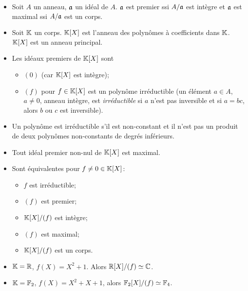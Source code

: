 \begin{itemize}
\item Soit $A$ un anneau, $\mathfrak{a}$ un idéal de $A$. $\mathfrak{a}$ est premier ssi $A/\mathfrak{a}$ est intègre et $\mathfrak{a}$ est maximal ssi
  $A/\mathfrak{a}$ est un corps.

\item Soit $\mathbb{K}$ un corps. $\mathbb{K}[X]$ est l'anneau des polynômes à coefficients dans $\mathbb{K}$. $\mathbb{K}[X]$ est un anneau
  principal. 

\item Les idéaux premiers de $\mathbb{K}[X]$ sont
  \begin{itemize}
  \item $(0)$ (car $\mathbb{K}[X]$ est intègre);
  \item $(f)$ pour $f \in \mathbb{K}[X]$ est un polynôme irréductible (un élément $a \in A$, $a \neq 0$, anneau intègre, est
    \emph{irréductible} si $a$ n'est pas inversible et si $a = bc$, alors $b$ ou $c$ est inversible).
  \end{itemize}

\item Un polynôme est irréductible s'il est non-constant et il n'est pas un produit de deux polynômes
  non-constants de degrés inférieurs.

\item Tout idéal premier non-nul de $\mathbb{K}[X]$ est maximal.

\item Sont équivalentes pour $f \neq 0 \in \mathbb{K}[X]$:
  \begin{itemize}
  \item $f$ est irréductible;
  \item $(f)$ est premier;
  \item $\mathbb{K}[X]/(f)$ est intègre;
  \item $(f)$ est maximal;
  \item $\mathbb{K}[X]/(f)$ est un corps.
  \end{itemize}


\end{itemize}

\begin{exs}
  \begin{itemize}
  \item $\mathbb{K} = \mathbb{R}$, $f(X) = X^2 + 1$. Alors $\mathbb{R}[X]/(f) \simeq \mathbb{C}$.
  \item $\mathbb{K} = \mathbb{F}_2$, $f(X)= X^2 + X + 1$, alors $\mathbb{F}_2[X]/(f) \simeq \mathbb{F}_4$.
  \end{itemize}
\end{exs}

